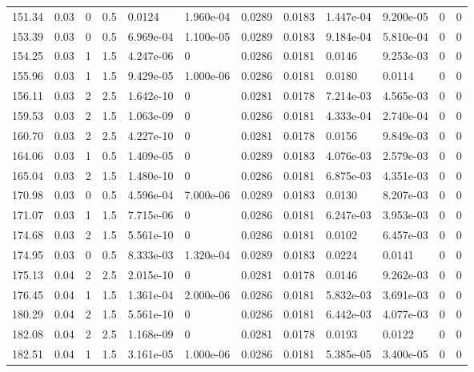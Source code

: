 \documentclass[preview]{standalone}
\begin{document}
{{{\begin{tabular}{L{1.2cm}C{1.2cm} C{0.3cm}C{0.5cm} C{1.4cm}C{1.4cm} C{1.4cm}C{1.4cm} C{1.6cm}C{1.6cm} C{1.6cm}C{1.6cm}}
  151.34  &  0.03  & 0     & 0.5 &  0.0124  & 1.960e-04  &  0.0289&   0.0183& 1.447e-04 & 9.200e-05   &  0 & 0  \\ 
  153.39  &  0.03  & 0     & 0.5 &  6.969e-04  & 1.100e-05  &  0.0289&   0.0183& 9.184e-04 & 5.810e-04   &  0 & 0  \\ 
  154.25  &  0.03  & 1     & 1.5 &  4.247e-06  & 0  &  0.0286&   0.0181& 0.0146 & 9.253e-03   &  0 & 0  \\ 
  155.96  &  0.03  & 1     & 1.5 &  9.429e-05  & 1.000e-06  &  0.0286&   0.0181& 0.0180 & 0.0114   &  0 & 0  \\ 
  156.11  &  0.03  & 2     & 2.5 &  1.642e-10  & 0  &  0.0281&   0.0178& 7.214e-03 & 4.565e-03   &  0 & 0  \\ 
  159.53  &  0.03  & 2     & 1.5 &  1.063e-09  & 0  &  0.0286&   0.0181& 4.333e-04 & 2.740e-04   &  0 & 0  \\ 
  160.70  &  0.03  & 2     & 2.5 &  4.227e-10  & 0  &  0.0281&   0.0178& 0.0156 & 9.849e-03   &  0 & 0  \\ 
  164.06  &  0.03  & 1     & 0.5 &  1.409e-05  & 0  &  0.0289&   0.0183& 4.076e-03 & 2.579e-03   &  0 & 0  \\ 
  165.04  &  0.03  & 2     & 1.5 &  1.480e-10  & 0  &  0.0286&   0.0181& 6.875e-03 & 4.351e-03   &  0 & 0  \\ 
  170.98  &  0.03  & 0     & 0.5 &  4.596e-04  & 7.000e-06  &  0.0289&   0.0183& 0.0130 & 8.207e-03   &  0 & 0  \\ 
  171.07  &  0.03  & 1     & 1.5 &  7.715e-06  & 0  &  0.0286&   0.0181& 6.247e-03 & 3.953e-03   &  0 & 0  \\ 
  174.68  &  0.03  & 2     & 1.5 &  5.561e-10  & 0  &  0.0286&   0.0181& 0.0102 & 6.457e-03   &  0 & 0  \\ 
  174.95  &  0.03  & 0     & 0.5 &  8.333e-03  & 1.320e-04  &  0.0289&   0.0183& 0.0224 & 0.0141   &  0 & 0  \\ 
  175.13  &  0.04  & 2     & 2.5 &  2.015e-10  & 0  &  0.0281&   0.0178& 0.0146 & 9.262e-03   &  0 & 0  \\ 
  176.45  &  0.04  & 1     & 1.5 &  1.361e-04  & 2.000e-06  &  0.0286&   0.0181& 5.832e-03 & 3.691e-03   &  0 & 0  \\ 
  180.29  &  0.04  & 2     & 1.5 &  5.561e-10  & 0  &  0.0286&   0.0181& 6.442e-03 & 4.077e-03   &  0 & 0  \\ 
  182.08  &  0.04  & 2     & 2.5 &  1.168e-09  & 0  &  0.0281&   0.0178& 0.0193 & 0.0122   &  0 & 0  \\ 
  182.51  &  0.04  & 1     & 1.5 &  3.161e-05  & 1.000e-06  &  0.0286&   0.0181& 5.385e-05 & 3.400e-05   &  0 & 0  \\ 

\end{tabular}}}}
\end{document}

